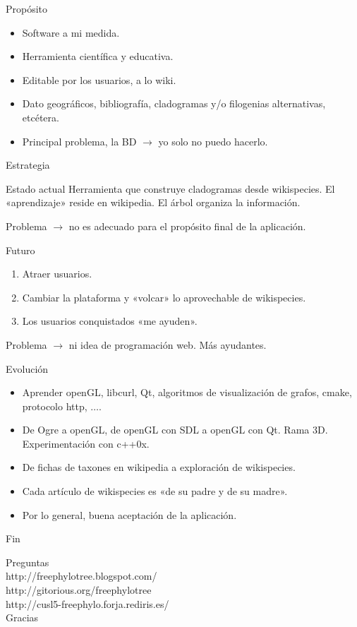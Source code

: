 \documentclass[green, compress]{beamer}
\begin{document}
\begin{frame}{Propósito}
\begin{itemize}
\item Software a mi medida.
\item Herramienta científica y educativa.
\item Editable por los usuarios, a lo wiki.
\item Dato geográficos, bibliografía, cladogramas y/o filogenias
  alternativas, etcétera.
\item Principal problema, la BD $\rightarrow$ yo solo no puedo hacerlo.
\end{itemize}
\end{frame}

\begin{frame}{Estrategia}
\begin{block}{Estado actual}
Herramienta que construye cladogramas desde wikispecies. El «aprendizaje» reside
en wikipedia. El árbol organiza la información.

Problema $\rightarrow$ no es adecuado para el propósito final de la aplicación.
\end{block}

\begin{block}{Futuro}
\begin{enumerate}
\item Atraer usuarios.
\item Cambiar la plataforma y «volcar» lo aprovechable de wikispecies.
\item Los usuarios conquistados «me ayuden».
\end{enumerate}

Problema $\rightarrow$ ni idea de programación web. Más ayudantes.
\end{block}
\end{frame}

\begin{frame}{Evolución}
\begin{itemize}
\item Aprender openGL, libcurl, Qt, algoritmos de visualización
  de grafos, cmake, protocolo http, $\ldots$.
\item De Ogre a openGL, de openGL con SDL a openGL con Qt. Rama
  3D. Experimentación con c++0x.
\item De fichas de taxones en wikipedia a exploración de wikispecies.
\item Cada artículo de wikispecies es «de su padre y de su madre».
\item Por lo general, buena aceptación de la aplicación.
\end{itemize}
\end{frame}

\begin{frame}{Fin}
\begin{center}
\Huge{Preguntas}\\
\vspace*{2ex}
\tiny{http://freephylotree.blogspot.com/}\\
\tiny{http://gitorious.org/freephylotree}\\
\tiny{http://cusl5-freephylo.forja.rediris.es/}\\
\vspace*{5ex}
\Huge{Gracias}
\end{center}
\end{frame}
\end{document}
